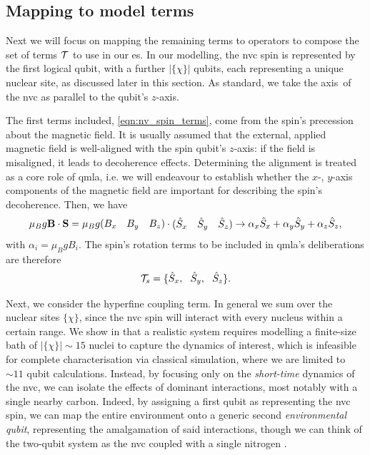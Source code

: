 \subsection{Mapping to model terms}
Next we will focus on mapping the remaining terms to operators to compose the set of terms 
    $\mathcal{T}$ to use in our \gls{es}. 
In our modelling, the \gls{nvc} spin is represented by the first logical qubit, 
    with a further $|\{\chi\}|$ qubits, each representing a unique nuclear site, 
    as discussed later in this section. 
As standard, we take the axis\footnotemark \ of the \gls{nvc} as parallel to the qubit's $z$-axis. 

\par 

The first terms included, \cref{eqn:nv_spin_terms}, come from the spin's precession about the magnetic field. 
It is usually assumed that the external, applied magnetic field is well-aligned with the spin qubit's $z$-axis:
    if the field is misaligned, it leads to decoherence effects. 
Determining the alignment is treated as a core role of \gls{qmla}, 
    i.e. we will endeavour to establish whether the $x$-, $y$-axis components of the magnetic field 
    are important for describing the spin's decoherence. 
Then, we have
\begin{equation}
    \label{eqn:spin_tensor_terms}
    \mu_B g \mathbf{B} \cdot \mathbf{S} 
    = \mu_B g \begin{matrix}(B_x & B_y & B_z)\end{matrix} \cdot \begin{matrix}(\hat{S}_x & \hat{S}_y & \hat{S}_z)\end{matrix}
    \rightarrow \alpha_x \hat{S}_x + \alpha_y \hat{S}_y + \alpha_z \hat{S}_z,
\end{equation}
with $\alpha_i = \mu_B g B_i$. 
The spin's rotation terms to be included in \gls{qmla}'s deliberations are therefore 
\begin{equation}
    \label{eqn:exp_spin_terms}
    \termset_{s} = \{ \hat{S}_x, \  \ \hat{S}_y, \ \ \hat{S}_z\}.
\end{equation}
\par 

Next, we consider the hyperfine coupling term. 
In general we sum over the nuclear sites $\{ \chi \}$, 
    since  the \gls{nvc} spin will interact with every nucleus within a certain range.
We show in \cite{gentile2020learning} that a realistic system requires modelling a 
    finite-size bath of $|\{\chi\}|\sim 15$ 
    nuclei to capture the dynamics of interest, 
    which is infeasible for complete characterisation via classical simulation, 
    where we are limited to $\sim 11$ qubit calculations\footnotemark. 
Instead, by focusing only on the \emph{short-time} dynamics of the \gls{nvc}, 
    we can isolate the effects of dominant interactions, 
    most notably with a single nearby \gls{carbon}. 
Indeed, by assigning a first qubit as representing the \gls{nvc} spin, 
    we can map the entire environment onto a generic second \emph{environmental qubit}, 
    representing the amalgamation of said interactions, 
    though we can think of the two-qubit system as the \gls{nvc} coupled with a single \gls{nitrogen} \cite{smeltzer201113c}. 

